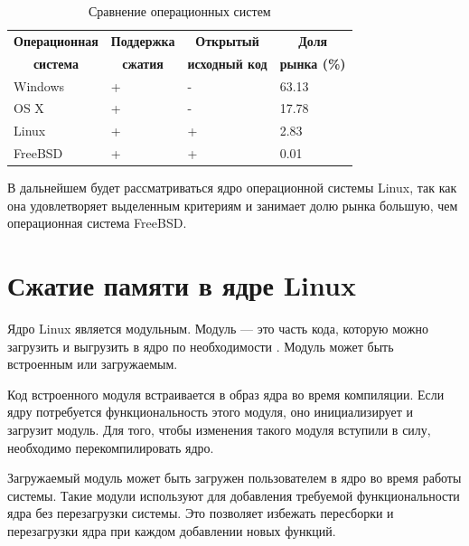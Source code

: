 \begin{table}[h]
    \caption{Сравнение операционных систем}
    \begin{center}
        \begin{tabular}{|l|l|l|l|}
        		\hline
            \multicolumn{1}{|c}{\textbf{Операционная}} & 
            \multicolumn{1}{|c|}{\textbf{Поддержка}} &
            \multicolumn{1}{c|}{\textbf{Открытый}} &
            \multicolumn{1}{c|}{\textbf{Доля}} \\
            \multicolumn{1}{|c}{\textbf{система}} & 
            \multicolumn{1}{|c|}{\textbf{сжатия}} &
            \multicolumn{1}{c|}{\textbf{исходный код}} &
            \multicolumn{1}{c|}{\textbf{рынка (\%)}} \\ \hline
            Windows &  + & - & 63.13 \\ \hline
            OS X & + & - & 17.78 \\ \hline
            Linux & + & + & 2.83 \\ \hline
            FreeBSD & + & + & 0.01 \\ \hline
        \end{tabular}
    \end{center}
    \label{tab:comparison-os}
\end{table}

В дальнейшем будет рассматриваться ядро операционной системы Linux, так как она удовлетворяет выделенным критериям и занимает долю рынка большую, чем операционная система FreeBSD.

\section{Сжатие памяти в ядре Linux}\label{linux-compression}

Ядро Linux является модульным. Модуль --- это часть кода, которую можно загрузить и выгрузить в ядро по необходимости \cite{module}. Модуль может быть встроенным или загружаемым.

Код встроенного модуля встраивается в образ ядра во время компиляции. Если ядру потребуется функциональность этого модуля, оно инициализирует и загрузит модуль. Для того, чтобы изменения такого модуля вступили в силу, необходимо перекомпилировать ядро.

Загружаемый модуль может быть загружен пользователем в ядро во время работы системы. Такие модули используют для добавления требуемой функциональности ядра без перезагрузки системы. Это позволяет избежать пересборки и перезагрузки ядра при каждом добавлении новых функций. 

